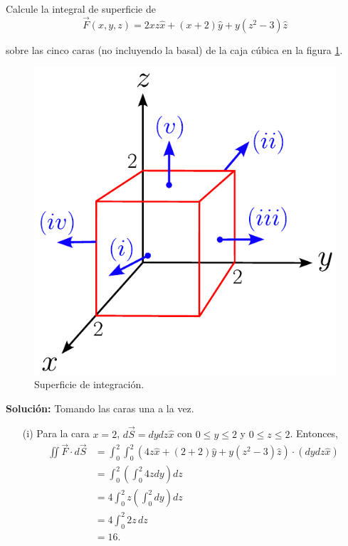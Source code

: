 \begin{ejemplo}
    Calcule la integral de superficie de 
    $$\Vec{F}(x,y,z) = 2xz \hat{x} + (x+2) \hat{y} + y(z^2-3) \hat{z}$$

    sobre las cinco caras (no incluyendo la basal) de la caja cúbica en la figura \ref{fig:Ej_Int_Superficie}.

    \begin{figure}[H]
        \centering
        \includegraphics[scale = 0.7]{Figuras/Ej-Integral-Superficie.pdf}
        \caption{Superficie de integración.}
        \label{fig:Ej_Int_Superficie}
    \end{figure}

    \textbf{Solución:}  Tomando las caras una a la vez.

    \begin{itemize}
        \item[(i)] Para la cara $x = 2$, $d\Vec{S} = dydz \hat{x}$ con $0 \leq y \leq 2$ y $0 \leq z \leq 2$. Entonces,
        \begin{align*}
             \iint \Vec{F} \cdot d\Vec{S} &= \int_0^2 \int_0^2 (4z \hat{x} + (2+2) \hat{y} + y(z^2-3) \hat{z}) \cdot (dydz \hat{x})  \\
             &= \int_0^2 \left( \int_0^2 4z dy\right) dz\\
             &= 4 \int_0^2 z \left( \int_0^2 dy \right) dz \\
             &= 4 \int_0^2 2z \,dz \\
             &= 16.
        \end{align*}


\end{itemize}
\end{ejemplo}
